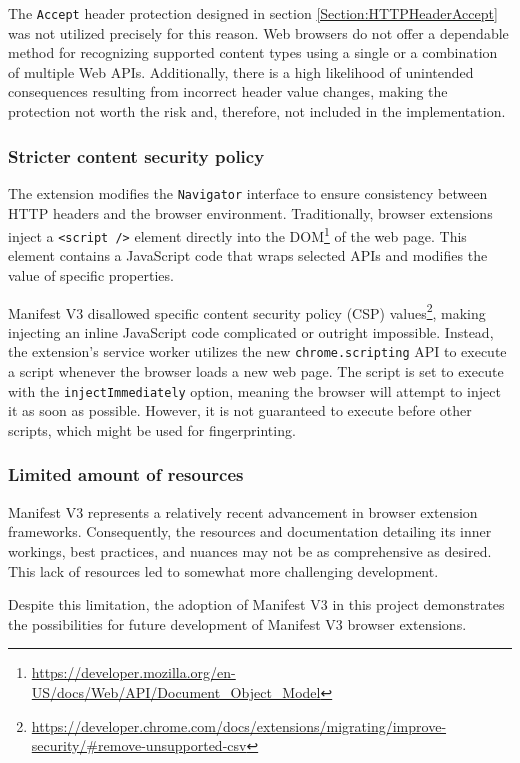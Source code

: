 The \texttt{Accept} header protection designed in section \ref{Section:HTTPHeaderAccept} was not utilized precisely for this reason. Web browsers do not offer a dependable method for recognizing supported content types using a single or a combination of multiple Web APIs. Additionally, there is a high likelihood of unintended consequences resulting from incorrect header value changes, making the protection not worth the risk and, therefore, not included in the implementation.

\subsubsection{Stricter content security policy}

The extension modifies the \texttt{Navigator} interface to ensure consistency between HTTP headers and the browser environment. Traditionally, browser extensions inject a \texttt{<script />} element directly into the DOM\footnote{\url{https://developer.mozilla.org/en-US/docs/Web/API/Document_Object_Model}} of the web page. This element contains a JavaScript code that wraps selected APIs and modifies the value of specific properties.

Manifest V3 disallowed specific content security policy (CSP) values\footnote{\url{https://developer.chrome.com/docs/extensions/migrating/improve-security/\#remove-unsupported-csv}}, making injecting an inline JavaScript code complicated or outright impossible. Instead, the extension's service worker utilizes the new \texttt{chrome.scripting} API to execute a script whenever the browser loads a new web page. The script is set to execute with the \texttt{injectImmediately} option, meaning the browser will attempt to inject it as soon as possible. However, it is not guaranteed to execute before other scripts, which might be used for fingerprinting.

\subsubsection{Limited amount of resources}

Manifest V3 represents a relatively recent advancement in browser extension frameworks. Consequently, the resources and documentation detailing its inner workings, best practices, and nuances may not be as comprehensive as desired. This lack of resources led to somewhat more challenging development.

Despite this limitation, the adoption of Manifest V3 in this project demonstrates the possibilities for future development of Manifest V3 browser extensions.

